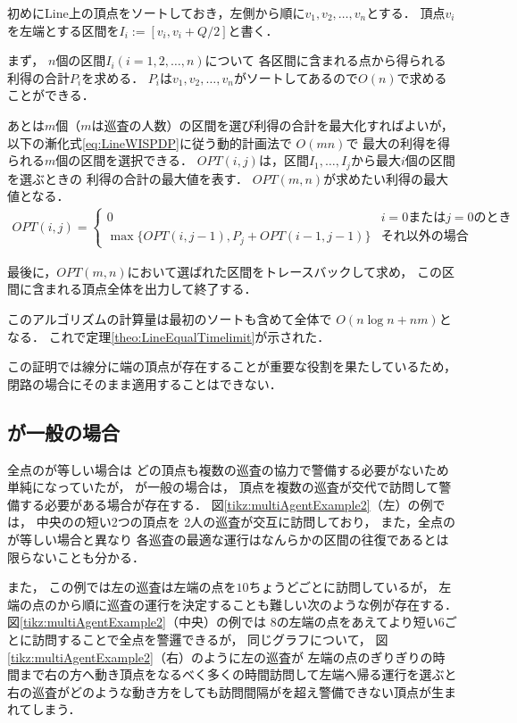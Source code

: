 初めにLine上の頂点をソートしておき，左側から順に$v_1,v_2,\ldots,v_n$とする．
頂点$v_i$を左端とする区間を$I_i := [v_i, v_i + Q/2]$と書く．

まず，
$n$個の区間$I_i (i = 1,2,\ldots, n)$について
各区間に含まれる点から得られる利得の合計$P_i$を求める．
$P_i$は$v_1,v_2,\ldots,v_n$がソートしてあるので$O(n)$で求めることができる．

あとは$m$個（$m$は巡査の人数）の区間を選び利得の合計を最大化すればよいが，
以下の漸化式\ref{eq:LineWISPDP}に従う動的計画法で
$O(mn)$で
最大の利得を得られる$m$個の区間を選択できる．
$OPT(i,j)$は，区間$I_1, \ldots, I_j$から最大$i$個の区間を選ぶときの
利得の合計の最大値を表す．
$OPT(m,n)$が求めたい利得の最大値となる．
\begin{align}
  \label{eq:LineWISPDP}
  OPT(i,j) = 
  \begin{cases}
    0 & \text{$i = 0$または$j = 0$のとき} \\
    \max \{
      OPT(i, j - 1), 
      P_j + OPT(i - 1, j - 1)
    \}
    & \text{それ以外の場合}
  \end{cases}
\end{align}

最後に，$OPT(m,n)$において選ばれた区間をトレースバックして求め，
この区間に含まれる頂点全体を出力して終了する．

このアルゴリズムの計算量は最初のソートも含めて全体で
$O(n \log n + nm)$となる．
これで定理\ref{theo:LineEqualTimelimit}が示された．



この証明では線分に端の頂点が存在することが重要な役割を果たしているため，
閉路の場合にそのまま適用することはできない．


\subsection{{\idletime}が一般の場合}
\label{subsec:LineDifferentTimelimit}

全点の{\idletime}が等しい場合は
どの頂点も複数の巡査の協力で警備する必要がないため単純になっていたが，
{\idletime}が一般の場合は，
頂点を複数の巡査が交代で訪問して警備する必要がある場合が存在する．
%
図\ref{tikz:multiAgentExample2}（左）の例では，
中央の{\idletime}の短い2つの頂点を
2人の巡査が交互に訪問しており，
また，全点の{\idletime}が等しい場合と異なり
各巡査の最適な運行はなんらかの区間の往復であるとは限らないことも分かる．


また，
この例では左の巡査は左端の点を{\idletime}$10$ちょうどごとに訪問しているが，
左端の点の{\idletime}から順に巡査の運行を決定することも難しい次のような例が存在する．
図\ref{tikz:multiAgentExample2}（中央）の例では
{\idletime}$8$の左端の点をあえてより短い$6$ごとに訪問することで全点を警邏できるが，
同じグラフについて，
図\ref{tikz:multiAgentExample2}（右）のように左の巡査が
左端の点の{\idletime}ぎりぎりの時間まで右の方へ動き頂点をなるべく多くの時間訪問して左端へ帰る運行を選ぶと
右の巡査がどのような動き方をしても訪問間隔が{\idletime}を超え警備できない頂点が生まれてしまう．



